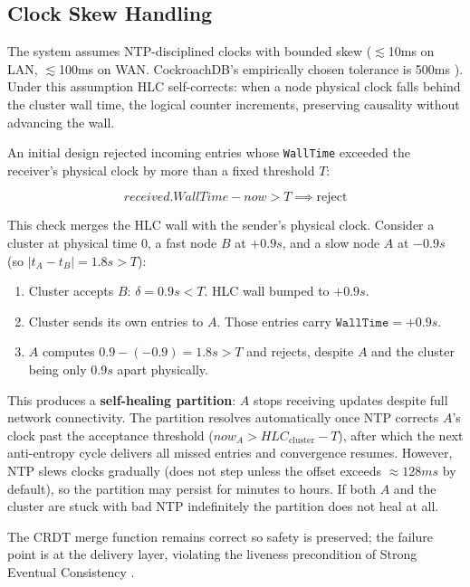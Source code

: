 \documentclass[conference]{IEEEtran}
\begin{document}
\subsection{Clock Skew Handling}

The system assumes NTP-disciplined clocks with bounded skew ($\lesssim$10ms on
  LAN, $\lesssim$100ms on WAN. CockroachDB's empirically chosen tolerance is
500ms \cite{cockroachdb2023}). Under this assumption HLC self-corrects: when a
node physical clock falls behind the cluster wall time, the logical counter
increments, preserving causality without advancing the wall.

An initial design rejected incoming entries whose \texttt{WallTime} exceeded the
receiver's physical clock by more than a fixed threshold $T$:

\begin{equation}
  \textit{received.WallTime} - \textit{now} > T \implies \text{reject}
\end{equation}

This check merges the HLC wall with the sender's physical clock.
Consider a cluster at physical time $0$, a fast
node $B$ at $+0.9s$, and a slow node $A$ at $-0.9s$
(so $|t_A - t_B| = 1.8s> T$):

\begin{enumerate}
  \item Cluster accepts $B$: $\delta = 0.9s < T$.  HLC wall bumped to $+0.9s$.
  \item Cluster sends its own entries to $A$.  Those entries carry
    $\texttt{WallTime} = +0.9s$.
  \item $A$ computes $0.9 - (-0.9) = 1.8s > T$ and rejects,
    despite $A$ and the cluster being only $0.9s$ apart physically.
\end{enumerate}

This produces a \textbf{self-healing partition}: $A$ stops
receiving updates despite full network connectivity. The partition resolves
automatically once NTP corrects $A$'s clock past the acceptance threshold
($\textit{now}_A > \textit{HLC}_\text{cluster} - T$), after which the next
anti-entropy cycle delivers all missed entries and convergence resumes. However,
NTP slews clocks gradually (does not step unless the offset exceeds $\approx
128ms$ by default), so the partition may persist for minutes to hours. If both
$A$ and the cluster are stuck with bad NTP indefinitely the partition does not
heal at all.

The CRDT merge function remains correct so safety is preserved; the failure point
is at the delivery layer, violating the liveness precondition of Strong
Eventual Consistency \cite{shapiro2011}.
\end{document}
